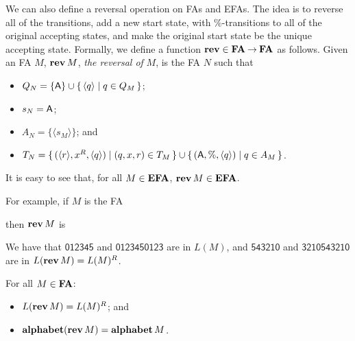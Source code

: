 We can also define a reversal operation on FAs and EFAs.  The idea is
to reverse all of the transitions, add a new start state, with
$\%$-transitions to all of the original accepting states, and make the
original start state be the unique accepting state.  Formally, we
define a function $\mathbf{rev}\in\mathbf{FA}\mathbin{\to}\mathbf{FA}$ as
%
%
%
%
%
%
follows.
Given an FA $M$, $\mathbf{rev}\,M$, \emph{the reversal of} $M$,
is the FA $N$ such that
\begin{itemize}
\item $Q_N=\{\mathsf{A}\}\cup\{ \, \langle q\rangle \mid q\in Q_M \, \}$;

\item $s_N=\mathsf{A}$;

\item $A_N=\{\langle s_M\rangle\}$; and

\item $T_N=\{ \, (\langle r\rangle, x^R, \langle q\rangle) \mid (q, x, r)\in T_M \, \} \cup
\{ \, (\mathsf{A}, \%, \langle q\rangle) \mid q\in A_M \, \}$.
\end{itemize}
It is easy to see that, for all $M\in\mathbf{EFA}$, $\mathbf{rev}\,M\in\mathbf{EFA}$.

For example, if $M$ is the FA
\begin{center}

\end{center}
then $\mathbf{rev}\,M$ is
\begin{center}

\end{center}
We have that $\mathsf{012345}$ and $\mathsf{0123450123}$ are in $L(M)$,
and $\mathsf{543210}$ and $\mathsf{3210543210}$ are in $L(\mathbf{rev}\,M)=L(M)^R$.

\begin{theorem}
\label{FARev}
For all $M\in\mathbf{FA}$:
\begin{itemize}
\item $L(\mathbf{rev}\,M) = L(M)^R$; and

\item $\mathbf{alphabet}(\mathbf{rev}\,M) = \mathbf{alphabet}\,M$.
\end{itemize}
\end{theorem}

